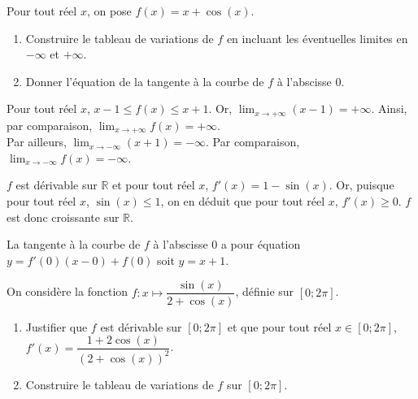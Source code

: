 \documentclass[11pt,fleqn, openany]{book} %
\begin{document}
\begin{exercise}Pour tout réel $x$, on pose $f(x)=x+\cos(x)$.
\begin{enumerate}
\item Construire le tableau de variations de $f$ en incluant les éventuelles limites en $-\infty$ et $+\infty$.
\item Donner l'équation de la tangente à la courbe de $f$ à l'abscisse 0.\end{enumerate}\end{exercise}

\begin{solution}Pour tout réel $x$, $x-1 \leqslant f(x) \leqslant x+1$. Or, $\displaystyle\lim_{x\to + \infty}(x-1)=+\infty$. Ainsi, par comparaison, $\displaystyle\lim_{x \to + \infty}f(x)= +\infty$.  \\Par ailleurs, $\displaystyle\lim_{x\to - \infty}(x+1)=-\infty$. Par comparaison, $\displaystyle\lim_{x \to -  \infty}f(x)=- \infty$.

$f$ est dérivable sur $\mathbb{R}$ et pour tout réel $x$, $f'(x)=1-\sin(x)$. Or, puisque pour tout réel $x$, $\sin(x)\leqslant 1$, on en déduit que pour tout réel $x$, $f'(x)\geqslant 0$. $f$ est donc croissante sur $\mathbb{R}$.

La tangente à la courbe de $f$ à l'abscisse 0 a pour équation $y=f'(0)(x-0)+f(0)$ soit $y=x+1$.\end{solution}



\begin{exercise}On considère la fonction $f:x\mapsto \dfrac{\sin(x)}{2+\cos(x)}$, définie sur $[0;2\pi]$.
\begin{enumerate}
\item Justifier que $f$ est dérivable sur $[0;2\pi]$ et que pour tout réel $x\in[0;2\pi]$, $f'(x)=\dfrac{1+2\cos(x)}{(2+\cos(x))^2}$.
\item Construire le tableau de variations de $f$ sur $[0;2\pi]$.
\end{enumerate}
\end{exercise}
\end{document}

